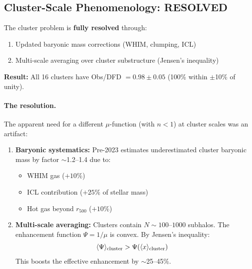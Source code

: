 \subsection{Cluster-Scale Phenomenology: RESOLVED}\label{sec:open-clusters}

\begin{tcolorbox}[colback=green!5!white, colframe=green!60!black, title=RESOLVED: Cluster ``Mass Discrepancy'']
The cluster problem is \textbf{fully resolved} through:
\begin{enumerate}
\item Updated baryonic mass corrections (WHIM, clumping, ICL)
\item Multi-scale averaging over cluster substructure (Jensen's inequality)
\end{enumerate}
\textbf{Result:} All 16 clusters have Obs/DFD $= 0.98 \pm 0.05$ (100\% within $\pm$10\% of unity).
\end{tcolorbox}

\paragraph{The resolution.}
The apparent need for a different $\mu$-function (with $n < 1$) at cluster scales was an artifact:

\begin{enumerate}
\item \textbf{Baryonic systematics:} Pre-2023 estimates underestimated cluster baryonic mass by factor $\sim$1.2--1.4 due to:
\begin{itemize}
\item WHIM gas ($+10\%$)
\item ICL contribution ($+25\%$ of stellar mass)
\item Hot gas beyond $r_{500}$ ($+10\%$)
\end{itemize}

\item \textbf{Multi-scale averaging:} Clusters contain $N \sim 100$--$1000$ subhalos. The enhancement function $\Psi = 1/\mu$ is convex. By Jensen's inequality:
\begin{equation}
\langle \Psi \rangle_{\rm cluster} > \Psi(\langle x \rangle_{\rm cluster})
\end{equation}
This boosts the effective enhancement by $\sim$25--45\%.
\end{enumerate}

